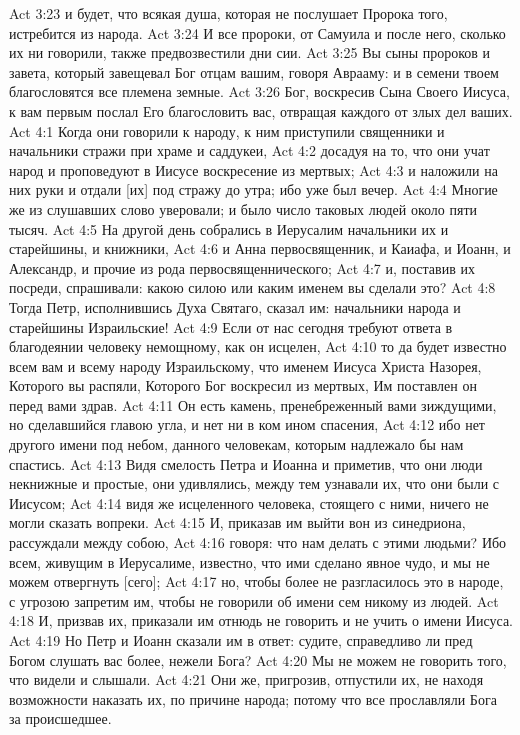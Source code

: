 Act 3:23  и будет, что всякая душа, которая не послушает Пророка того, истребится из народа.
Act 3:24  И все пророки, от Самуила и после него, сколько их ни говорили, также предвозвестили дни сии.
Act 3:25  Вы сыны пророков и завета, который завещевал Бог отцам вашим, говоря Аврааму: и в семени твоем благословятся все племена земные.
Act 3:26  Бог, воскресив Сына Своего Иисуса, к вам первым послал Его благословить вас, отвращая каждого от злых дел ваших.
Act 4:1  Когда они говорили к народу, к ним приступили священники и начальники стражи при храме и саддукеи,
Act 4:2  досадуя на то, что они учат народ и проповедуют в Иисусе воскресение из мертвых;
Act 4:3  и наложили на них руки и отдали [их] под стражу до утра; ибо уже был вечер.
Act 4:4  Многие же из слушавших слово уверовали; и было число таковых людей около пяти тысяч.
Act 4:5  На другой день собрались в Иерусалим начальники их и старейшины, и книжники,
Act 4:6  и Анна первосвященник, и Каиафа, и Иоанн, и Александр, и прочие из рода первосвященнического;
Act 4:7  и, поставив их посреди, спрашивали: какою силою или каким именем вы сделали это?
Act 4:8  Тогда Петр, исполнившись Духа Святаго, сказал им: начальники народа и старейшины Израильские!
Act 4:9  Если от нас сегодня требуют ответа в благодеянии человеку немощному, как он исцелен,
Act 4:10  то да будет известно всем вам и всему народу Израильскому, что именем Иисуса Христа Назорея, Которого вы распяли, Которого Бог воскресил из мертвых, Им поставлен он перед вами здрав.
Act 4:11  Он есть камень, пренебреженный вами зиждущими, но сделавшийся главою угла, и нет ни в ком ином спасения,
Act 4:12  ибо нет другого имени под небом, данного человекам, которым надлежало бы нам спастись.
Act 4:13  Видя смелость Петра и Иоанна и приметив, что они люди некнижные и простые, они удивлялись, между тем узнавали их, что они были с Иисусом;
Act 4:14  видя же исцеленного человека, стоящего с ними, ничего не могли сказать вопреки.
Act 4:15  И, приказав им выйти вон из синедриона, рассуждали между собою,
Act 4:16  говоря: что нам делать с этими людьми? Ибо всем, живущим в Иерусалиме, известно, что ими сделано явное чудо, и мы не можем отвергнуть [сего];
Act 4:17  но, чтобы более не разгласилось это в народе, с угрозою запретим им, чтобы не говорили об имени сем никому из людей.
Act 4:18  И, призвав их, приказали им отнюдь не говорить и не учить о имени Иисуса.
Act 4:19  Но Петр и Иоанн сказали им в ответ: судите, справедливо ли пред Богом слушать вас более, нежели Бога?
Act 4:20  Мы не можем не говорить того, что видели и слышали.
Act 4:21  Они же, пригрозив, отпустили их, не находя возможности наказать их, по причине народа; потому что все прославляли Бога за происшедшее.
